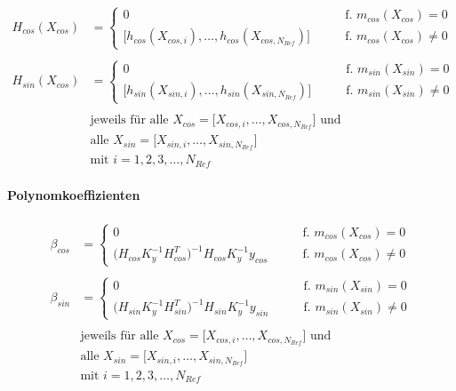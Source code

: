 \begin{align}\label{eq:hmatrix}
	H_{cos}(X_{cos}) &=
		\begin{cases}
			0 															   &\qquad \text{f. } m_{cos}(X_{cos}) = 0 \\
			\big[ h_{cos}(X_{cos,i}),\ldots,h_{cos}(X_{cos,N_{Ref}}) \big] &\qquad \text{f. } m_{cos}(X_{cos}) \ne 0
		\end{cases} \nonumber \\
	\\
	H_{sin}(X_{cos}) &=
		\begin{cases}
			0															   &\qquad \text{f. } m_{sin}(X_{sin}) = 0 \\
			\big[ h_{sin}(X_{sin,i}),\ldots,h_{sin}(X_{sin,N_{Ref}}) \big] &\qquad \text{f. } m_{sin}(X_{sin}) \ne 0
		\end{cases} \nonumber \\
	\nonumber \\
	& \text{jeweils für alle } X_{cos} = \big[ X_{cos,i},\dots, X_{cos,N_{Ref}} \big] \text{ und } \nonumber \\
	& \text{alle } X_{sin} = \big[ X_{sin,i},\dots, X_{sin,N_{Ref}} \big] \nonumber \\
	& \text{mit } i = 1,2,3,\ldots,N_{Ref} \nonumber
\end{align}


\paragraph*{Polynomkoeffizienten}


\begin{align}\label{eq:betacoeffs}
	\beta_{cos} &= 
		\begin{cases}
			0 																	 &\qquad \text{f. } m_{cos}(X_{cos}) = 0\\
			\big( H_{cos} K_y^{-1} H_{cos}^T \big)^{-1} H_{cos} K_y^{-1} y_{cos} &\qquad \text{f. } m_{cos}(X_{cos}) \ne 0
		\end{cases} \nonumber \\
	\\
	\beta_{sin} &= 
		\begin{cases}
			0 																	 &\qquad \text{f. } m_{sin}(X_{sin}) = 0\\
			\big( H_{sin} K_y^{-1} H_{sin}^T \big)^{-1} H_{sin} K_y^{-1} y_{sin} &\qquad \text{f. } m_{sin}(X_{sin}) \ne 0
		\end{cases} \nonumber \\
	\nonumber \\
	& \text{jeweils für alle } X_{cos} = \big[ X_{cos,i},\dots, X_{cos,N_{Ref}} \big] \text{ und } \nonumber \\
	& \text{alle } X_{sin} = \big[ X_{sin,i},\dots, X_{sin,N_{Ref}} \big] \nonumber \\
	& \text{mit } i = 1,2,3,\ldots,N_{Ref} \nonumber
\end{align}


